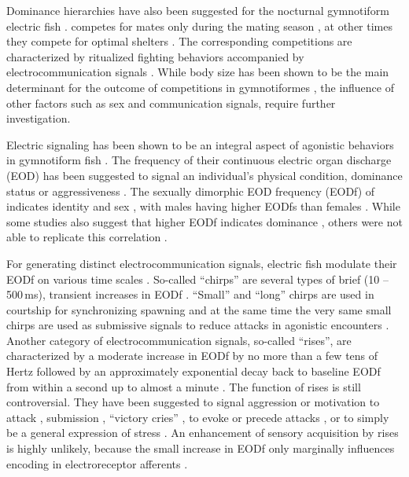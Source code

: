 Dominance hierarchies have also been suggested for the nocturnal gymnotiform electric fish \Lepto{} \citep{Dunlap2002, Stamper2010, Raab2019}. \lepto{} competes for mates only during the mating season \citep{Hagedorn1985, Henninger2018}, at other times they compete for optimal shelters \citep{Dunlap2002}. The corresponding competitions are characterized by ritualized fighting behaviors accompanied by electrocommunication signals \citep{Triefenbach2008, Smith2013}. While body size has been shown to be the main determinant for the outcome of competitions in gymnotiformes \citep{Silva2012, Triefenbach2008, Dunlap2002}, the influence of other factors such as sex and communication signals, require further investigation.

Electric signaling has been shown to be an integral aspect of agonistic behaviors in gymnotiform fish \citep{Westby1970, Silva2012, Hupe2008, Henninger2018}. The frequency of their continuous electric organ discharge (EOD) has been suggested to signal an individual's physical condition, dominance status or aggressiveness \citep{Westby1970, Hagedorn1985, Cuddy2012}. The sexually dimorphic EOD frequency (EODf) of \lepto{} indicates identity and sex \citep{Henninger2020}, with males having higher EODfs than females \citep{Meyer1987}. While some studies also suggest that higher EODf indicates dominance \citep{Hagedorn1985, Dunlap2002, Henninger2018, Raab2019}, others were not able to replicate this correlation \citep{Triefenbach2008}.

For generating distinct electrocommunication signals, electric fish modulate their EODf on various time scales \citep{Benda2020}. So-called ``chirps'' are several types of brief (10 -- 500\,ms), transient increases in EODf \citep{Engler2000, Zakon2002,Hupe2008b}. ``Small'' and ``long'' chirps are used in courtship for synchronizing spawning \citep{Henninger2018} and at the same time the very same small chirps are used as submissive signals to reduce attacks in agonistic encounters \citep{Hupe2008, Henninger2018}. Another category of electrocommunication signals, so-called ``rises'', are characterized by a moderate increase in EODf by no more than a few tens of Hertz followed by an approximately exponential decay back to baseline EODf from within a second up to almost a minute \citep{Hopkins1974, Engler2000, Tallarovic2002, Zakon2002}. The function of rises is still controversial. They have been suggested to signal aggression or motivation to attack \citep{Tallarovic2005, Triefenbach2008}, submission \citep{Hopkins1974, Serrano2003}, ``victory cries'' \citep{Dye1987}, to evoke or precede attacks \citep{Hopkins1974, Triefenbach2008}, or to simply be a general expression of stress \citep{Smith2013}. An enhancement of sensory acquisition by rises is highly unlikely, because the small increase in EODf only marginally influences encoding in electroreceptor afferents \citep{Walz2014}.


